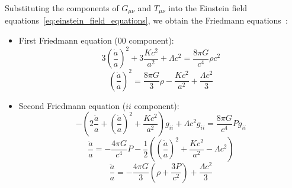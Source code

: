 Substituting the components of \( G_{\mu\nu} \) and \( T_{\mu\nu} \) into the Einstein field equations~\eqref{eq:einstein_field_equations}, we obtain the Friedmann equations~\citep{1922ZPhy...10..377F}:
\begin{itemize}
    \item First Friedmann equation ($00$ component):
    \begin{equation}
        3 \left( \frac{\dot{a}}{a} \right)^2 + 3\frac{Kc^2}{a^2} + \Lambda c^2 = \frac{8\pi G}{c^4} \rho c^2
    \end{equation}
    \begin{equation}
        \left( \frac{\dot{a}}{a} \right)^2 = \frac{8\pi G}{3} \rho - \frac{Kc^2}{a^2} + \frac{\Lambda c^2}{3}
        \label{eq:friedmann_first}
    \end{equation}
    \item Second Friedmann equation ($ii$ component):
    \begin{equation}
        -\left(2\frac{\ddot{a}}{a} + \left( \frac{\dot{a}}{a} \right)^2 + \frac{Kc^2}{a^2}\right)g_{ii} + \Lambda c^2 g_{ii} = \frac{8\pi G}{c^4} P g_{ii}
    \end{equation}
    \begin{equation}
        \frac{\ddot{a}}{a} = -\frac{4\pi G}{c^4} P - \frac{1}{2} \left(\left( \frac{\dot{a}}{a} \right)^2 
            + \frac{Kc^2}{a^2} - \Lambda c^2 \right)
    \end{equation}
    \begin{equation}
        \frac{\ddot{a}}{a} = -\frac{4\pi G}{3} \left( \rho + \frac{3P}{c^2} \right) + \frac{\Lambda c^2}{3}
        \label{eq:friedmann_second}
    \end{equation}
\end{itemize}


